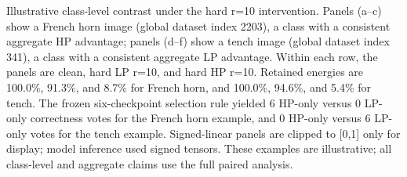 Illustrative class-level contrast under the hard r=10 intervention. Panels (a–c) show a French horn image (global dataset index 2203), a class with a consistent aggregate HP advantage; panels (d–f) show a tench image (global dataset index 341), a class with a consistent aggregate LP advantage. Within each row, the panels are clean, hard LP r=10, and hard HP r=10. Retained energies are 100.0\%, 91.3\%, and 8.7\% for French horn, and 100.0\%, 94.6\%, and 5.4\% for tench. The frozen six-checkpoint selection rule yielded 6 HP-only versus 0 LP-only correctness votes for the French horn example, and 0 HP-only versus 6 LP-only votes for the tench example. Signed-linear panels are clipped to [0,1] only for display; model inference used signed tensors. These examples are illustrative; all class-level and aggregate claims use the full paired analysis.